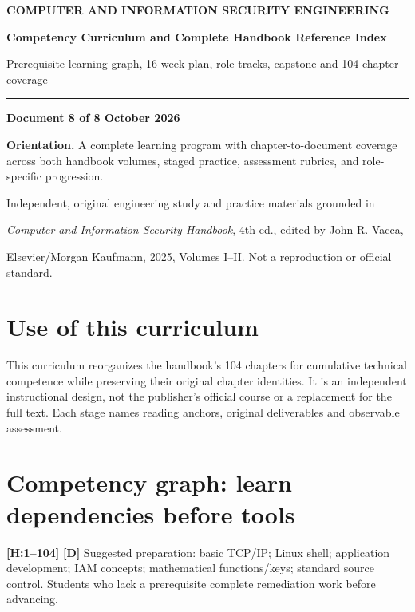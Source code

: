 \documentclass[10pt,letterpaper,oneside]{article}
\newcommand{\handbookref}[1]{\textsf{\color{accent}\textbf{[H:#1]}}}
\newcommand{\designed}{\textsf{\color{accent}\textbf{[D]}}}
\newcommand{\makereportcover}[4]{%
\hypersetup{pageanchor=false}%

\thispagestyle{empty}\vspace*{1.15in}
{\small\bfseries\color{accent} COMPUTER AND INFORMATION SECURITY ENGINEERING}\par\vspace{13pt}
{\raggedright\Huge\bfseries\color{ink} #1\par}\vspace{15pt}
{\Large\color{muted} #2\par}\vspace{18pt}
\color{accent}\rule{0.94\textwidth}{2.1pt}\par\vspace{20pt}
{\normalsize\bfseries Document #3 of 8 \quad\textbullet\quad 16 October 2026\par}
\vspace{0.35in}
\begin{sourcebox}\textbf{Orientation.} #4\end{sourcebox}
\vfill
{\small\color{muted} Independent, original engineering study and practice materials grounded in\par
\emph{Computer and Information Security Handbook}, 4th ed., edited by John R. Vacca,\par
Elsevier/Morgan Kaufmann, 2025, Volumes I--II. Not a reproduction or official standard.}
\newpage\hypersetup{pageanchor=true}\setcounter{page}{1}\tableofcontents\newpage
}
\begin{document}
\makereportcover{Competency Curriculum and Complete Handbook Reference Index}{Prerequisite learning graph, 16-week plan, role tracks, capstone and 104-chapter coverage}{8}{A complete learning program with chapter-to-document coverage across both handbook volumes, staged practice, assessment rubrics, and role-specific progression.}

\section{Use of this curriculum}
This curriculum reorganizes the handbook's 104 chapters for cumulative technical competence while preserving their original chapter identities. It is an independent instructional design, not the publisher's official course or a replacement for the full text. Each stage names reading anchors, original deliverables and observable assessment.

\section{Competency graph: learn dependencies before tools}
\begin{center}
\end{center}
\handbookref{1--104} \designed{} Suggested preparation: basic TCP/IP; Linux shell; application development; IAM concepts; mathematical functions/keys; standard source control. Students who lack a prerequisite complete remediation work before advancing.
\end{document}
